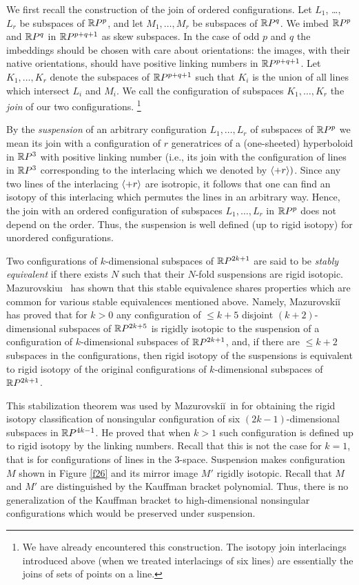 \documentclass{article}
\begin{document}
We first recall the construction of the join of ordered configurations. Let
$L_1$, \dots, $L_r$ be subspaces of $\mathbb{R} P^p$, and let $M_1,\dotsc,M_r$ 
be subspaces of $\mathbb{R} P^q$. We imbed $\mathbb{R} P^p$ and $\mathbb{R} P^q$ in $\mathbb{R} 
P^{p+q+1}$ as skew subspaces. In the case of odd $p$ and $q$ the
imbeddings should be chosen with care about orientations: the images, 
with their native orientations, should have positive linking numbers in 
$\mathbb{R} P^{p+q+1}$.  Let $K_1,\dotsc,K_r$ denote the subspaces
of $\mathbb{R} P^{p+q+1}$ such that $K_i$ is the union of all lines which intersect
$L_i$ and $M_i$. We call the configuration of subspaces $K_1,\dotsc,K_r$ the
{\it join\/} of our two configurations.
\footnote{We have already encountered this construction. The 
isotopy join
interlacings introduced above (when we treated interlacings of six lines) are
essentially the joins of sets of points on a line.}


By the {\it suspension\/} of an arbitrary configuration $L_1,\dotsc,L_r$ of
subspaces of $\mathbb{R} P^p$ we mean its join with a configuration of $r$
generatrices of a (one-sheeted) hyperboloid in $\mathbb{R} P^3$ with positive
linking number (i.e., its join with the configuration of lines in $\mathbb{R} 
P^3$ corresponding to the interlacing which we denoted by $\langle+r\rangle)$. Since
any two lines of the interlacing $\langle+r\rangle$ are isotropic, it follows that
one can find an isotopy of this interlacing which permutes the lines in an
arbitrary way. Hence, the join with an ordered configuration of subspaces
$L_1,\dotsc,L_r$ in $\mathbb{R} P^p$ does not depend on the order. Thus, the
suspension is well defined (up to rigid isotopy) for unordered configurations.

Two configurations of $k$-dimensional subspaces of $\mathbb{R} P^{2k+1}$ are
said to be {\em stably equivalent\/} if there exists $N$ such that
their $N$-fold suspensions are rigid isotopic. Mazurovskiu\i\ \cite{11}
has shown that this stable equivalence shares properties which are
common for various stable equivalences mentioned above. Namely, 
Mazurovski\u{i}\  \cite{11} has proved that for $k>0$ any configuration 
of $\le k+5$ disjoint
$(k+2)$-dimensional subspaces of $\mathbb{R} P^{2k+5}$ is rigidly isotopic to 
the suspension of a configuration of
 $k$-dimensional subspaces of $\mathbb{R} P^{2k+1}$, and, if there are 
$\le k+2$ subspaces in the configurations, then
rigid isotopy of the suspensions is equivalent to rigid isotopy of the original
configurations of $k$-dimensional subspaces of $\mathbb{R} P^{2k+1}$.

This stabilization theorem was used by Mazurovski\u{i}\  in \cite{11} for
obtaining the rigid isotopy classification of nonsingular configuration
of six $(2k-1)$-dimensional subspaces in $\mathbb{R} P^{4k-1}$. He proved that
when $k>1$ such configuration is defined up to rigid isotopy by the
linking numbers. Recall that this is not the case for $k=1$, that is
for configurations of lines in the 3-space. Suspension makes
configuration $M$ shown in Figure \ref{f26} and its mirror image $M'$
rigidly isotopic. Recall that $M$ and $M'$ are distinguished by the
Kauffman bracket polynomial. Thus, there is no generalization of
the Kauffman bracket to high-dimensional nonsingular configurations
which would be preserved under suspension. 
\end{document}
